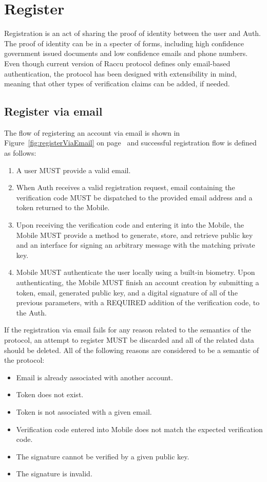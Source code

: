 \section{Register}
Registration is an act of sharing the proof of identity between the user and Auth. The proof of identity
can be in a specter of forms, including high confidence government issued documents and low confidence emails and 
phone numbers. Even though current version of Raccu protocol defines only email-based authentication, the protocol
has been designed with extensibility in mind, meaning that other types of verification claims can be added, if
needed.

      \subsection{Register via email}
      The flow of registering an account via email is shown in Figure~\ref{fig:registerViaEmail} on 
      page~\pageref{fig:registerViaEmail} and successful registration flow is defined as follows:
      \begin{enumerate}
            \item A user MUST provide a valid email.
            \item When Auth receives a valid registration request, email containing the verification code MUST 
                  be dispatched to the provided email address and a token returned to the Mobile.
            \item Upon receiving the verification code and entering it into the Mobile, the Mobile MUST provide 
                  a method to generate, store, and retrieve public key and an interface for signing an arbitrary 
                  message with the matching private key.
            \item Mobile MUST authenticate the user locally using a built-in biometry. Upon authenticating, 
                  the Mobile MUST finish an account creation by submitting a token, email, generated public key, 
                  and a digital signature of all of the previous parameters, with a REQUIRED addition of the 
                  verification code, to the Auth.
      \end{enumerate}
             
      If the registration via email fails for any reason related to the semantics of the protocol, an attempt to
      register MUST be discarded and all of the related data should be deleted. All of the following reasons are 
      considered to be a semantic of the protocol:
      \begin{itemize}
            \item Email is already associated with another account.
            \item Token does not exist.
            \item Token is not associated with a given email.
            \item Verification code entered into Mobile does not match the expected verification code.
            \item The signature cannot be verified by a given public key.
            \item The signature is invalid.
      \end{itemize}
